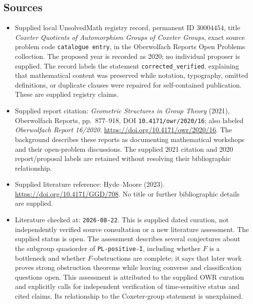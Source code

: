 \documentclass[11pt]{article}
\begin{document}
\subsection{Sources}
\begin{itemize}
\item Supplied local UnsolvedMath registry record, permanent ID \(30004454\), title \emph{Coxeter Quotients of Automorphism Groups of Coxeter Groups}, exact source problem code \texttt{catalogue entry}, in the Oberwolfach Reports Open Problems collection. The proposed year is recorded as 2020; no individual proposer is supplied. The record labels the statement \texttt{corrected\_verified}, explaining that mathematical content was preserved while notation, typography, omitted definitions, or duplicate clauses were repaired for self-contained publication. These are supplied registry claims.
\item Supplied report citation: \emph{Geometric Structures in Group Theory} (2021), Oberwolfach Reports, pp.~877--918, DOI \texttt{10.4171/owr/2020/16}; also labeled \emph{Oberwolfach Report 16/2020}. \url{https://doi.org/10.4171/owr/2020/16}. The background describes these reports as documenting mathematical workshops and their open-problem discussions. The supplied 2021 citation and 2020 report/proposal labels are retained without resolving their bibliographic relationship.
\item Supplied literature reference: Hyde--Moore (2023). \url{https://doi.org/10.4171/GGD/708}. No title or further bibliographic details are supplied.
\item Literature checked at: \texttt{2026-08-22}. This is supplied dated curation, not independently verified source consultation or a new literature assessment. The supplied status is open. The assessment describes several conjectures about the subgroup quasiorder of \texttt{PL-positive-I}, including whether \(F\) is a bottleneck and whether \(F\)-obstructions are complete; it says that later work proves strong obstruction theorems while leaving converse and classification questions open. This assessment is attributed to the supplied OWR curation and explicitly calls for independent verification of time-sensitive status and cited claims. Its relationship to the Coxeter-group statement is unexplained.
\end{itemize}
\end{document}
